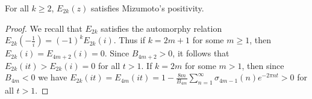 \documentclass[10pt,a4paper]{amsart}
\begin{document}
\begin{proposition} \label{miz1}
For all $k \geq 2$, $E_{2k}(z)$ satisfies Mizumoto's positivity. 
\end{proposition}

\begin{proof}
We recall that $E_{2k}$ satisfies the automorphy relation
$
E_{2k} \left(-\frac{1}{i} \right ) = (-1)^{k} E_{2k}(i). 
$
Thus if $k=2m+1$ for some $m \geq 1$, then $E_{2k}(i)=E_{4m+2}(i)=0$. Since $B_{4m+2}>0$, it follows that  
$
E_{2k}(it)>E_{2k}(i)=0 
$
for all $t>1$. If $k=2m$ for some $m > 1$, then since $B_{4m}<0$ we have 
$
E_{2k}(it)=E_{4m}(it)= 1-\frac{8m}{B_{4m}} \sum_{n=1}^{\infty} \sigma_{4m-1}(n) e^{- 2 \pi  n t}>0 
$ 
for all $t >1$. 
\end{proof}
\end{document}
